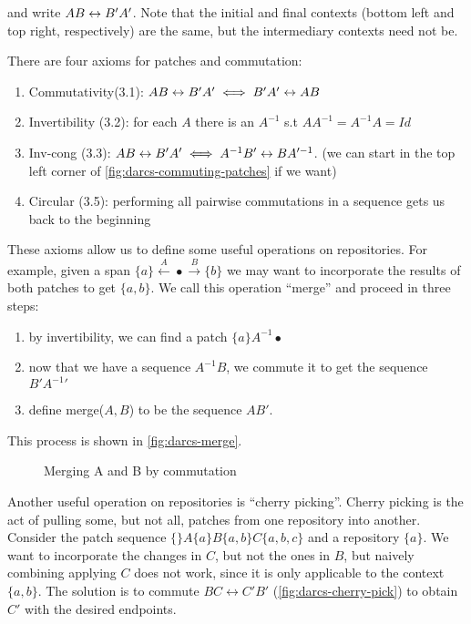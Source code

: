 and write $AB \leftrightarrow B'A'$. Note that the initial and final contexts (bottom left and top right,
respectively) are the same, but the intermediary contexts need not be.

There are four axioms for patches and commutation:
\begin{enumerate}
  \item Commutativity(3.1): $AB \leftrightarrow B'A' \iff B'A' \leftrightarrow AB$
  \item Invertibility (3.2): for each $A$ there is an $A^{-1}$ s.t
    $AA^{-1}=A^{-1}A=Id$
  \item Inv-cong (3.3): $AB \leftrightarrow B'A' \iff A^{-1}B' \leftrightarrow BA'^{-1}$. (we can
    start in the top left corner of \autoref{fig:darcs-commuting-patches} if we want)
    \label{axiom:darcs-inv-cong}
  \item Circular (3.5): performing all pairwise commutations in a sequence
    gets us back to the beginning
\end{enumerate}

These axioms allow us to define some useful operations on repositories. For
example, given a span $\{a\} \xleftarrow{A} \bullet \xrightarrow{B} \{b\}$ we
may want to incorporate the results of both patches to get $\{a,b\}$. We call
this operation ``merge'' and proceed in three steps:
\begin{enumerate}
\item by invertibility, we can find a patch $\{a\}A^{-1} \bullet$
\item now that we have a sequence $A^{-1}B$, we commute it to get the sequence $B'{A^{-1}}'$
\item define merge($A, B$) to be the sequence $AB'$.
\end{enumerate}
This process is shown in \autoref{fig:darcs-merge}.

\begin{figure}
\begin{center}
\end{center}
\caption{Merging A and B by commutation}
\label{fig:darcs-merge}
\end{figure}

Another useful operation on repositories is ``cherry picking''. Cherry picking
is the act of pulling some, but not all, patches from one repository into another.
Consider the patch sequence $\{\}A\{a\}B\{a,b\}C\{a,b,c\}$ and a repository
$\{a\}$. We want to incorporate the changes in $C$, but not the ones in $B$, but
naively combining applying $C$ does not work, since it is only applicable to the
context $\{a,b\}$. The solution is to commute $BC \leftrightarrow C'B'$ (\autoref{fig:darcs-cherry-pick}) to
obtain $C'$ with the desired endpoints.

